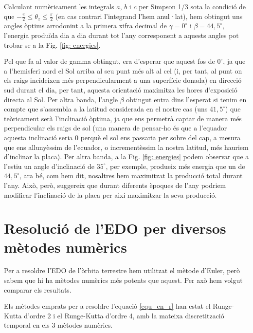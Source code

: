 \documentclass[11pt]{article}
\begin{document}
Calculant numèricament les integrals $a$, $b$ i $c$ per Simpson 1/3 sota la condició de que $-\frac{\pi}{2} \leq \theta_z \leq \frac{\pi}{2}$ (en cas contrari l'integrand l'hem anul·lat), hem obtingut uns angles òptims arrodonint a la primera xifra decimal de $\gamma=0^\circ$ i $\beta=44,5^\circ$, l'energia produïda dia a dia durant tot l'any corresponent a aquests angles pot trobar-se a la Fig. \ref{fig: energies}. 

Pel que fa al valor de gamma obtingut, era d'esperar que aquest fos de $0^\circ$, ja que a l'hemisferi nord el Sol arriba al seu punt més alt al cel (i, per tant, al punt on els raigs incideixen més perpendicularment a una superfície donada) en direcció sud durant el dia, per tant, aquesta orientació maximitza les hores d'exposició directa al Sol. Per altra banda, l'angle $\beta$ obtingut entra dins l'esperat si tenim en compte que s'assembla a la latitud considerada en el nostre cas (uns $41,5^\circ$) que teòricament serà l'inclinació òptima, ja que ens permetrà captar de manera més perpendicular els raigs de sol (una manera de pensar-ho és que a l'equador aquesta inclinació seria 0 perquè el sol ens passaria per sobre del cap, a mesura que ens allunyèssim de l'ecuador, o incrementèssim la nostra latitud, més hauriem d'inclinar la placa). Per altra banda, a la Fig. \ref{fig: energies} podem observar que a l'estiu un angle d'inclinació de $35^\circ$, per exemple, produeix més energia que un de $44,5^\circ$, ara bé, com hem dit, nosaltres hem maximitzat la producció total durant l'any. Això, però, suggereix que durant diferents èpoques de l'any podriem modificar l'inclinació de la placa per així maximitzar la seva producció.

\section{Resolució de l'EDO per diversos mètodes numèrics}\label{sec: edos}
Per a resoldre l'EDO de l'òrbita terrestre hem utilitzat el mètode d'Euler, però sabem que hi ha mètodes numèrics més potents que aquest. Per axò hem volgut comparar els resultats.

Els mètodes emprats per a resoldre l'equació \eqref{equ_en_r} han estat el Runge-Kutta d'ordre 2 i el Runge-Kutta d'ordre 4, amb la mateixa discretització temporal en els 3 mètodes numèrics.
\end{document}
